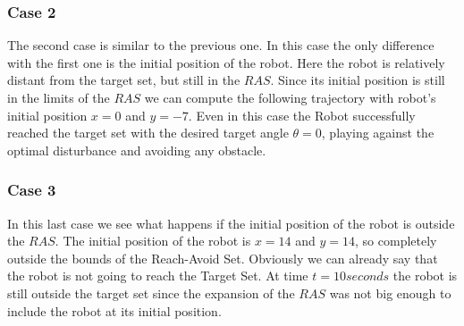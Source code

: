 \subsubsection{Case 2}
The second case is similar to the previous one. In this case the only difference with the first one is the initial position of the robot. Here the robot is relatively distant from the target set, but still in the $RAS$. 
Since its initial position is still in the limits of the $RAS$ we can compute the following trajectory with robot's initial position $x=0$ and $y=-7$.
Even in this case the Robot successfully reached the target set with the desired target angle $\theta=0$, playing against the optimal disturbance and avoiding any obstacle.

\subsubsection{Case 3}
In this last case we see what happens if the initial position of the robot is outside the $RAS$. 
The initial position of the robot is $x=14$ and $y=14$, so completely outside the bounds of the Reach-Avoid Set.
Obviously we can already say that the robot is not going to reach the Target Set.
At time $t=10 seconds$ the robot is still outside the target set since the expansion of the $RAS$ was not big enough to include the robot at its initial position.
        


